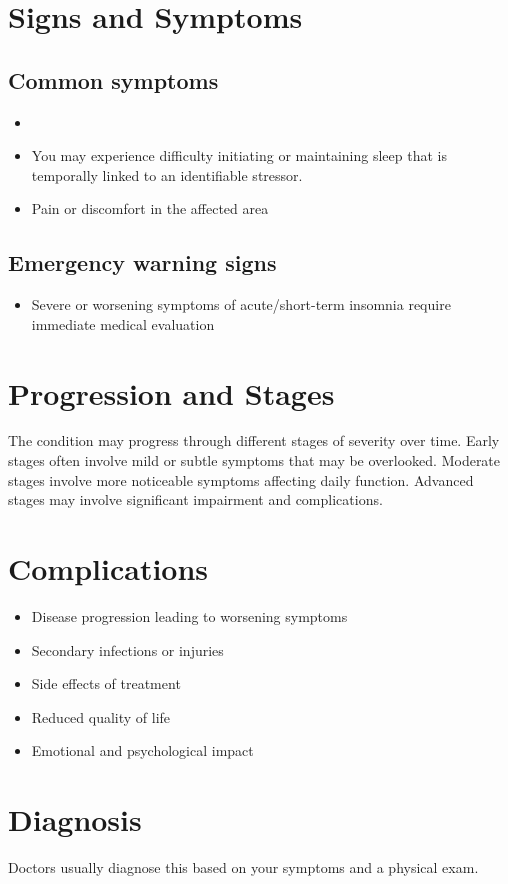 \section{Signs and Symptoms}
\subsection{Common symptoms}
\begin{itemize}[noitemsep]
  \item \item You may experience difficulty initiating or maintaining sleep that is temporally linked to an identifiable stressor.
  \item Pain or discomfort in the affected area
  \end{itemize}
\subsection{Emergency warning signs}
\begin{itemize}[noitemsep]
  \item Severe or worsening symptoms of acute/short-term insomnia require immediate medical evaluation
\end{itemize}
\section{Progression and Stages}
The condition may progress through different stages of severity over time. Early stages often involve mild or subtle symptoms that may be overlooked. Moderate stages involve more noticeable symptoms affecting daily function. Advanced stages may involve significant impairment and complications.
\section{Complications}
\begin{itemize}[noitemsep]
  \item Disease progression leading to worsening symptoms
  \item Secondary infections or injuries
  \item Side effects of treatment
  \item Reduced quality of life
  \item Emotional and psychological impact
\end{itemize}
\section{Diagnosis}
Doctors usually diagnose this based on your symptoms and a physical exam.

